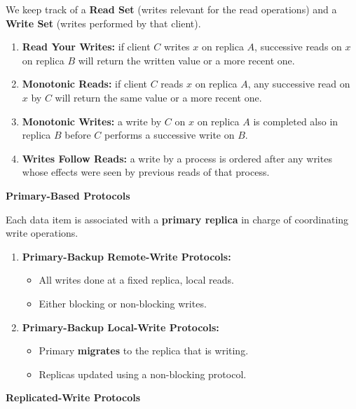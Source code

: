 \documentclass[a4paper, 10pt, twocolumn]{article}
\begin{document}
    We keep track of a \textbf{Read Set} (writes relevant for the read operations) and a \textbf{Write Set} (writes performed by that client).
    \begin{enumerate}
        \item \textbf{Read Your Writes:} if client $C$ writes $x$ on replica $A$, successive reads on $x$ on replica $B$ will return the written value or a more recent one.
        \item \textbf{Monotonic Reads:} if client $C$ reads $x$ on replica $A$, any successive read on $x$ by $C$ will return the same value or a more recent one.
        \item \textbf{Monotonic Writes:} a write by $C$ on $x$ on replica $A$ is completed also in replica $B$ before $C$ performs a successive write on $B$.
        \item \textbf{Writes Follow Reads:} a write by a process is ordered after any writes whose effects were seen by previous reads of that process.
    \end{enumerate}

    \textbf{Primary-Based Protocols}

    Each data item is associated with a \textbf{primary replica} in charge of coordinating write operations.
    \begin{enumerate}
        \item \textbf{Primary-Backup Remote-Write Protocols:}
        \begin{itemize}
            \item All writes done at a fixed replica, local reads.
            \item Either blocking or non-blocking writes.
        \end{itemize}
        \item \textbf{Primary-Backup Local-Write Protocols:}
        \begin{itemize}
            \item Primary \textbf{migrates} to the replica that is writing.
            \item Replicas updated using a non-blocking protocol.
        \end{itemize}
    \end{enumerate}

    \textbf{Replicated-Write Protocols}
\end{document}
